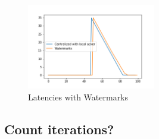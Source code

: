 \begin{figure}[htbp]
  \centering
  \includegraphics[width=0.50\textwidth]{pics/buffering_latencies_evolution_watermarks.png}
  \caption{Latencies with Watermarks}
\end{figure}

\subsection{Count iterations?}

